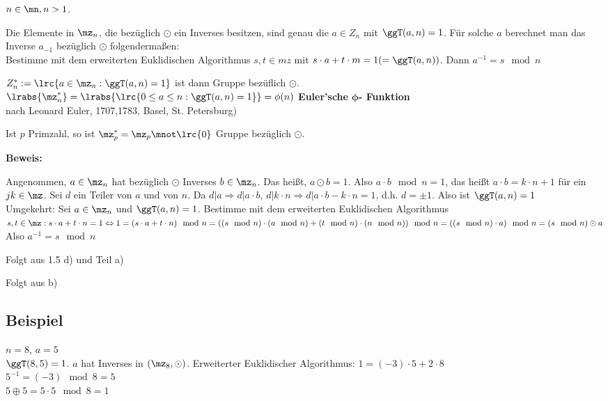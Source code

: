 	$n\in\mn,n>1$.
		\item Die Elemente in $\mz_n$, die bezüglich $\odot$ ein Inverses besitzen, sind genau die $a\in Z_n$ mit $\ggT(a,n)=1$. Für solche $a$ berechnet man das Inverse $a_{-1}$ bezüglich $\odot$ folgendermaßen:\\
		Bestimme mit dem erweiterten Euklidischen Algorithmus $s,t\in mz$ mit $s\cdot a+t\cdot m=1(=\ggT(a,n))$. Dann $a^{-1}=s\mod n$
		
		\item $Z_n^*:=\lrc{a\in\mz_n:\ggT(a,n)=1}$ ist dann Gruppe bezüflich $\odot$.\\
		$\lrabs{\mz_n^*}=\lrabs{\lrc{0\leq a\leq n:\ggT(a,n)=1}}=\phi(n)$ \textbf{Euler'sche} $\mathbf{\phi}$\textbf{- Funktion}\\ nach Leonard Euler, 1707,1783, Basel, St. Petersburg)
		
		\item Ist $p$ Primzahl, so ist $\mz_p^*=\mz_p\mnot\lrc{0}$ Gruppe bezüglich $\odot$.
	\subExEnd
	
	\textbf{Beweis:}
		\item Angenommen, $a\in\mz_n$ hat bezüglich $\odot$ Inverses $b\in\mz_n$. Das heißt, $a\odot b=1$. Also $a\cdot b\mod n=1$, das heißt $a\cdot b=k\cdot n+1$ für ein $jk\in\mz$. Sei $d$ ein Teiler von $a$ und von $n$. Da $d|a\Rightarrow d|a\cdot b$, $d|k\cdot n\Rightarrow d|a\cdot b-k\cdot n=1$, d.h. $d=\pm 1$. Also ist $\ggT(a,n)=1$\\
		Umgekehrt: Sei $a\in\mz_n$ und $\ggT(a,n)=1$. Bestimme mit dem erweiterten Euklidischen Algorithmus $s,t\in\mz:s\cdot a+t\cdot n=1\Leftrightarrow 1=(s\cdot a+t\cdot n)\mod n=((s\mod n)\cdot(a\mod n)+(t\mod n)\cdot(n\mod n))\mod n=((s\mod n)\cdot a)\mod n=(s\mod n)\odot a$\\
		Also $a^{-1}=s\mod n$
		
		\item Folgt aus 1.5 d) und Teil a)
		\item Folgt aus b)
	\subExEnd
	
	\subsection{Beispiel}
	
	$n=8$, $a=5$\\
	$\ggT(8,5)=1$. $a$ hat Inverses in $(\mz_8,\odot)$.
	Erweiterter Euklidischer Algorithmus: $1=(-3)\cdot 5+2\cdot 8$\\
	$5^{-1}=(-3)\mod 8=5$\\
	$5\oplus 5=5\cdot 5\mod 8=1$
	
